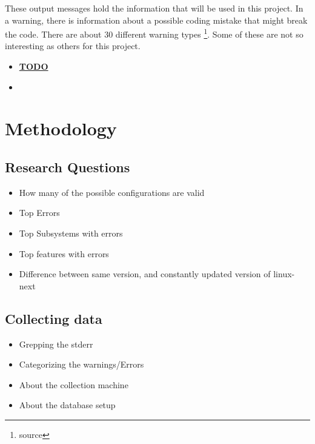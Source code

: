 \documentclass[a4paper,11pt]{article}
\begin{document}
These output messages hold the information that will be used in this project. 
In a warning, there is information about a possible coding mistake that might 
break the code. There are about 30 different warning types \footnote{source}. 
Some of these are not so interesting as others for this project.


\begin{itemize}
    \item \underline{\textbf{TODO}}
    \item 
\end{itemize}


\newpage
\section{Methodology}

\subsection{Research Questions}

\begin{itemize}
    \item How many of the possible configurations are valid
    \item Top Errors
    \item Top Subsystems with errors
    \item Top features with errors
    \item Difference between same version, and constantly updated version of 
        linux-next
\end{itemize}

\subsection{Collecting data}

\begin{itemize}
    \item Grepping the stderr
    \item Categorizing the warnings/Errors
    \item About the collection machine
    \item About the database setup
\end{itemize}
\end{document}
